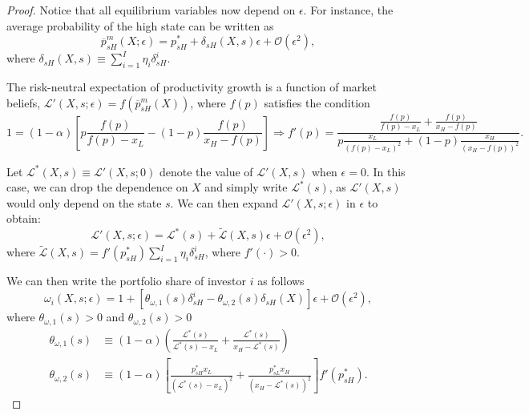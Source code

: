 \begin{proof}
Notice that all equilibrium variables now depend on $\epsilon$. For instance, the average probability of the high state can be written as
\begin{equation}
    \overline{p}_{sH}^m(X;\epsilon) = p_{sH}^* + \delta_{sH}(X,s) \epsilon  + \mathcal{O}(\epsilon^2),
\end{equation}
where $\delta_{sH}(X,s) \equiv \sum_{i=1} ^I\eta_i \delta_{sH}^i$. 

The risk-neutral expectation of productivity growth is a function of market beliefs, $\mathcal{L}'(X,s; \epsilon) = f(\overline{p}^m_{sH}(X))$, where $f(p)$ satisfies the condition\small
\begin{equation}
    1 = (1-\alpha) \left[ p \frac{f(p)}{f(p)-x_L} - (1-p) \frac{f(p)}{x_H - f(p)}  \right] \Rightarrow 
    f'(p) = \frac{\frac{f(p)}{f(p)-x_L} + \frac{f(p)}{x_H - f(p)}}{p \frac{x_L}{(f(p) - x_L)^2} + (1-p) \frac{x_H}{(x_H-f(p))^2}}.
\end{equation}\normalsize

Let $\mathcal{L}^*(X,s) \equiv \mathcal{L}'(X,s;0)$ denote the value of $\mathcal{L}'(X,s)$ when $\epsilon = 0$. In this case, we can drop the dependence on $X$ and simply write $\mathcal{L}^*(s)$, as $\mathcal{L}'(X,s)$ would only depend on the state $s$. We can then expand $\mathcal{L}'(X,s;\epsilon)$ in $\epsilon$ to obtain:
\begin{equation}
    \mathcal{L}'(X,s;\epsilon) = \mathcal{L}^*(s) + \tilde{\mathcal{L}}(X,s) \epsilon + \mathcal{O}(\epsilon^2),
\end{equation}
where $\tilde{\mathcal{L}}(X,s) = f'(p_{sH}^*) \sum_{i=1}^I \eta_i \delta_{sH}^i$, where $f'(\cdot) > 0$. 

We can then write the portfolio share of investor $i$ as follows
\begin{equation}
    \omega_{i}(X,s; \epsilon) = 1 +\left[ \theta_{\omega,1}(s) \delta_{sH}^i - \theta_{\omega,2}(s) \delta_{sH}(X) \right] \epsilon + \mathcal{O}(\epsilon^2),
\end{equation}
where $\theta_{\omega,1}(s) > 0$ and $\theta_{\omega,2}(s) > 0$
\begin{align}
    \theta_{\omega,1}(s) &\equiv (1-\alpha)\left(  \frac{\mathcal{L}^*(s)}{\mathcal{L}^*(s) - x_L} + \frac{\mathcal{L}^*(s)}{x_H-\mathcal{L}^*(s)} \right)\\
    \theta_{\omega,2}(s) &\equiv (1-\alpha) \left[\frac{ p_{sH}^* x_L}{(\mathcal{L}^*(s) - x_L)^2}+  \frac{p_{sL}^*x_H}{(x_H - \mathcal{L}^*(s))^2} \right] f'(p_{sH}^*).
\end{align}


\end{proof}
